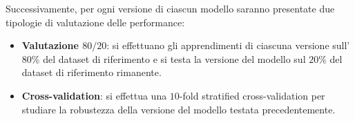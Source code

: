 \begin{table}[!ht]
    \caption{Riassunto delle operazioni effettuate sui dataset e utilizzo dei dataset per i modelli.}
    \label{tab:riassunto_operazioni_dataset}
\end{table}

Successivamente, per ogni versione di ciascun modello saranno presentate due
tipologie di valutazione delle performance:
\begin{itemize}
    \item \textbf{Valutazione $80/20$}: si effettuano gli apprendimenti di
          ciascuna versione sull'$80\%$ del dataset di riferimento e si testa
          la versione del modello sul $20\%$ del dataset di riferimento rimanente.
    \item \textbf{Cross-validation}: si effettua una $10$-fold stratified
          cross-validation per studiare la robustezza della versione del modello
          testata precedentemente.
\end{itemize}


